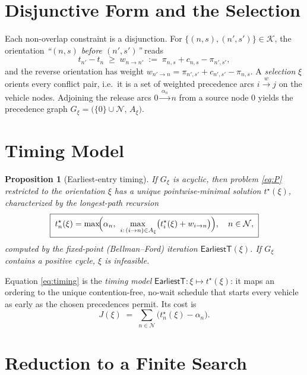 \documentclass[12pt]{article}
\newtheorem{proposition}{Proposition}
\begin{document}
\section{Disjunctive Form and the Selection}\label{sec:disj}

Each non-overlap constraint is a disjunction. For
$\{(n,s),(n',s')\}\in\mathcal{K}$, the orientation \emph{``$(n,s)$ before
$(n',s')$''} reads
\begin{equation}\label{eq:arc}
t_{n'}-t_{n}\;\ge\;w_{n\to n'}\;:=\;\pi_{n,s}+c_{n,s}-\pi_{n',s'},
\end{equation}
and the reverse orientation has weight
$w_{n'\to n}=\pi_{n',s'}+c_{n',s'}-\pi_{n,s}$.
A \emph{selection} $\xi$ orients every conflict pair, i.e.\ it is a set of
weighted precedence arcs $i\xrightarrow{\,w\,}j$ on the vehicle nodes.
Adjoining the release arcs $0\xrightarrow{\,\alpha_n\,}n$ from a source node $0$
yields the precedence graph $G_\xi=\bigl(\{0\}\cup\mathcal{N},\,A_\xi\bigr)$.

\section{Timing Model}\label{sec:timing}

\begin{proposition}[Earliest-entry timing]\label{prop:timing}
If $G_\xi$ is acyclic, then problem \eqref{eq:P} restricted to the orientation
$\xi$ has a unique pointwise-minimal solution $t^\star(\xi)$, characterized by
the longest-path recursion
\begin{equation}\label{eq:timing}
\boxed{\;
t^\star_n(\xi)=\max\!\Bigl(\alpha_n,\;
\max_{\,i:\,(i\to n)\in A_\xi}\bigl(t^\star_i(\xi)+w_{i\to n}\bigr)\Bigr),
\quad n\in\mathcal{N},\;}
\end{equation}
computed by the fixed-point \textnormal{(}Bellman--Ford\textnormal{)} iteration
$\mathsf{EarliestT}(\xi)$. If $G_\xi$ contains a positive cycle, $\xi$ is
infeasible.
\end{proposition}

Equation \eqref{eq:timing} is the \emph{timing model}
$\mathsf{EarliestT}:\xi\mapsto t^\star(\xi)$: it maps an ordering to the unique
contention-free, no-wait schedule that starts every vehicle as early as the
chosen precedences permit. Its cost is
\begin{equation}\label{eq:J}
J(\xi)\;=\;\sum_{n\in\mathcal{N}}\bigl(t^\star_n(\xi)-\alpha_n\bigr).
\end{equation}

\section{Reduction to a Finite Search}\label{sec:reduction}
\end{document}
